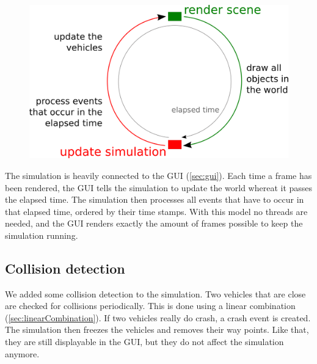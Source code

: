 \begin{figure}[H]
\begin{center}
\includegraphics[scale=0.5]{images/simulationprocess.png}
\end{center}
\end{figure}

\noindent The simulation is heavily connected to the GUI (\ref{sec:gui}). Each
time a frame has been rendered, the GUI tells the simulation to update the 
world whereat it passes the elapsed time. The simulation then processes all
events that have to occur in that elapsed time, ordered by their time stamps.
With this model no threads are needed, and the GUI renders exactly the amount
of frames possible to keep the simulation running.

\subsection{Collision detection}

We added some collision detection to the simulation. Two vehicles
that are close are checked for collisions periodically. This is done
using a linear combination (\ref{sec:linearCombination}). If two
vehicles really do crash, a crash event is created. The simulation
then freezes the vehicles and removes their way points. Like that, they
are still displayable in the GUI, but they do not affect the 
simulation anymore.

